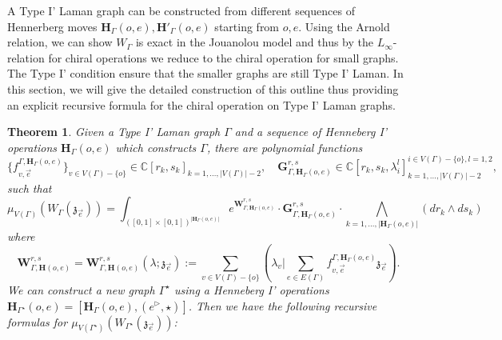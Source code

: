 \documentclass[11pt]{amsart}
\newtheorem{thm}{Theorem}[section]
\theoremstyle{definition}
\theoremstyle{remark}
\numberwithin{equation}{section}
\begin{document}
A Type I' Laman graph can be constructed from different sequences of Hennerberg moves $\mathbf{H}_{\Gamma}(o,e),
\mathbf{H}'_{\Gamma}(o,e)$ starting from $o, e$.
Using the Arnold relation, we can show $W_{\Gamma}$ is exact in the
Jouanolou model and thus by the $L_{\infty}$-relation for chiral operations we reduce to the chiral operation for small
graphs.
The Type I' condition ensure that the smaller graphs are still Type I' Laman.
In this section, we will give the detailed construction of this outline thus providing an explicit recursive formula for the chiral operation on Type I' Laman graphs.

\begin{thm}\label{MainTheoremRecursiveRS}
Given a Type I' Laman graph $\Gamma$ and a sequence of Henneberg I' operations $\mathbf{H}_{\Gamma}(o,e)$ which constructs $\Gamma$, there are polynomial functions $$
\{f^{\Gamma,\mathbf{H}_{\Gamma}(o,e)}_{v,\vec{e}}\}_{v\in V(\Gamma)-\{o\}}\in \mathbb{C}[r_k,s_k]_{k=1,\dots,|V(\Gamma)|-2},\quad \mathbf{G}^{r,s}_{\Gamma,\mathbf{H}_{\Gamma}(o,e)}\in \mathbb{C}[r_k,s_k,\lambda^l_i]^{i\in V(\Gamma)-\{o\},l=1,2}_{k=1,\dots,|V(\Gamma)|-2},$$
  such that
$$
\mu_{V(\Gamma)}\left(W_{\Gamma}(\mathfrak{z}_{\vec{e}})\right)=\int_{([0,1]\times[0,1])^{|\mathbf{H}_{\Gamma}(o,e)|}}e^{\mathbf{W}^{r,s}_{\Gamma,\mathbf{H}_{\Gamma}(o,e)}}\cdot \mathbf{G}^{r,s}_{\Gamma,\mathbf{H}_{\Gamma}(o,e)}\cdot \bigwedge_{k=1,\dots,|\mathbf{H}_{\Gamma}(o,e)|} (dr_k\wedge ds_k)
$$
where
$$
    \mathbf{W}^{r,s}_{\Gamma,\mathbf{H}(o,e)}=\mathbf{W}^{r,s}_{\Gamma,\mathbf{H}(o,e)}(\lambda;\mathfrak{z}_{\vec{e}}):=\sum_{v\in V(\Gamma)-\{o\}}(\lambda_v|\sum_{e\in E(\Gamma)}f^{\Gamma,\mathbf{H}_{\Gamma}(o,e)}_{v,\vec{e}}\mathfrak{z}_{\vec{e}}).
$$
We can construct a new graph $\Gamma^{\star}$ using a Henneberg I' operations $\mathbf{H}_{\Gamma^{\star}}(o,e)=[\mathbf{H}_{\Gamma}(o,e),(e^\triangleright,\star)]$. Then we have the following recursive formulas for $\mu_{V(\Gamma^{\star})}\left(W_{\Gamma^{\star}}(\mathfrak{z}_{\vec{e}})\right)$:


\end{thm}
\end{document}
